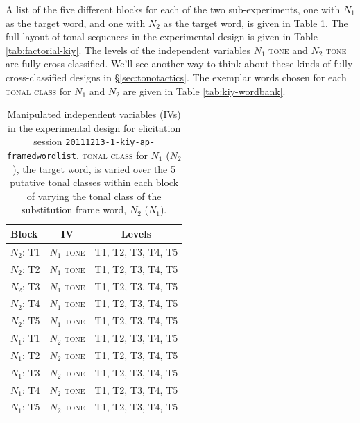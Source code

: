 \documentclass[12pt]{article}
\begin{document}
A list of the five different blocks for each of the two
sub-experiments, one with $N_1$ as the target word, and one with $N_2$
as the target word, is given in Table
\ref{tab:kiy-20111213-bigrams}. The full layout of tonal sequences in
the experimental design is given in Table \ref{tab:factorial-kiy}. The
levels of the independent variables $N_1$ \textsc{tone} and $N_2$
\textsc{tone} are fully cross-classified. We'll see another way to
think about these kinds of fully cross-classified designs in
\S\ref{sec:tonotactics}. The exemplar words chosen for each
\textsc{tonal class} for $N_1$ and $N_2$ are given in Table
\ref{tab:kiy-wordbank}.

\begin{table}[!h]
  \centering
  \begin{tabular}{l | c c}
    Block & IV  & Levels\\\hline
    $N_2$: T1 & $N_1$ \textsc{tone} & T1, T2, T3, T4, T5\\
    $N_2$: T2 & $N_1$ \textsc{tone} & T1, T2, T3, T4, T5\\
    $N_2$: T3 & $N_1$ \textsc{tone} & T1, T2, T3, T4, T5\\
    $N_2$: T4 & $N_1$ \textsc{tone} & T1, T2, T3, T4, T5\\
    $N_2$: T5 & $N_1$ \textsc{tone} & T1, T2, T3, T4, T5\\\hline
    $N_1$: T1 & $N_2$ \textsc{tone} & T1, T2, T3, T4, T5\\
    $N_1$: T2 & $N_2$ \textsc{tone} & T1, T2, T3, T4, T5\\
    $N_1$: T3 & $N_2$ \textsc{tone} & T1, T2, T3, T4, T5\\
    $N_1$: T4 & $N_2$ \textsc{tone} & T1, T2, T3, T4, T5\\
    $N_1$: T5 & $N_2$ \textsc{tone} & T1, T2, T3, T4, T5\\
  \end{tabular}
  \caption{Manipulated independent variables (IVs) in the experimental
    design for elicitation session
    \texttt{20111213-1-kiy-ap-framedwordlist}. \textsc{tonal class}
    for $N_1$ ($N_2$), the target word, is varied over the 5 putative tonal
    classes within each block of varying the tonal class of the
    substitution frame word, $N_2$ ($N_1$). }
  \label{tab:kiy-20111213-bigrams}
\end{table}
\end{document}
